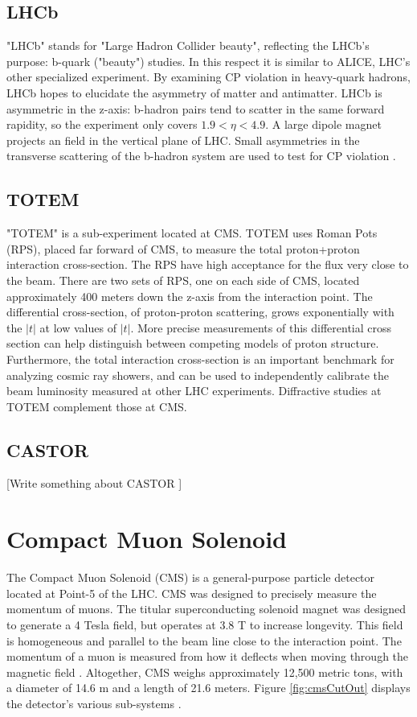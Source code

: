 \subsection{LHCb}

"LHCb" stands for "Large Hadron Collider beauty", reflecting the LHCb's purpose: b-quark ("beauty") studies. In this respect it is similar to ALICE, LHC's other specialized experiment. By examining CP violation in heavy-quark hadrons, LHCb hopes to elucidate the asymmetry of matter and antimatter. LHCb is asymmetric in the z-axis: b-hadron pairs tend to scatter in the same forward rapidity, so the experiment only covers $1.9<\eta<4.9$. A large dipole magnet projects an field in the vertical plane of LHC. Small asymmetries in the transverse scattering of the b-hadron system are used to test for CP violation \cite{Alves:2008zz}. 

\subsection{TOTEM}

"TOTEM" is a sub-experiment located at CMS. TOTEM uses Roman Pots (RPS), placed far forward of CMS, to measure the total proton+proton interaction cross-section. The RPS have high acceptance for the flux very close to the beam. There are two sets of RPS, one on each side of CMS, located approximately 400 meters down the z-axis from the interaction point. The differential cross-section, of proton-proton scattering, grows exponentially with the $|t|$ at low values of $|t|$. More precise measurements of this differential cross section can help distinguish between competing models of proton structure. Furthermore, the total interaction cross-section is an important benchmark for analyzing cosmic ray showers, and can be used to independently calibrate the beam luminosity measured at other LHC experiments. Diffractive studies at TOTEM complement those at CMS.

\subsection{CASTOR}

[Write something about CASTOR \cite{Andreev:2010zzb} ]

\section{Compact Muon Solenoid}

The Compact Muon Solenoid (CMS) is a general-purpose particle detector located at Point-5 of the LHC. CMS was designed to precisely measure the momentum of muons. The titular superconducting solenoid magnet was designed to generate a 4 Tesla field, but operates at 3.8 T to increase longevity. This field is homogeneous and parallel to the beam line close to the interaction point. The momentum of a muon is measured from how it deflects when moving through the magnetic field \cite{CmsPTdrv2}. Altogether, CMS weighs approximately 12,500 metric tons, with a diameter of 14.6 m and a length of 21.6 meters. Figure \ref{fig:cmsCutOut} displays the detector's various sub-systems \cite{dEnterria:2007iyi}. 

